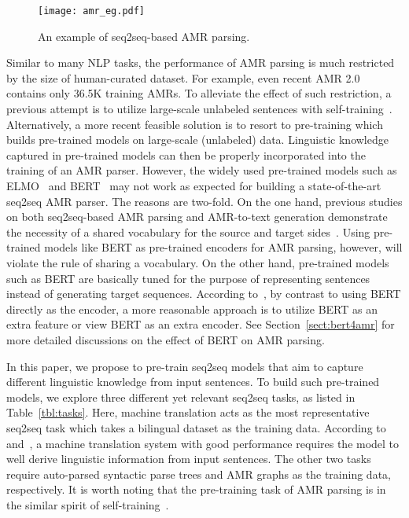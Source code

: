 \documentclass[11pt,a4paper]{article}
\newcommand{\ignore}[1]{}
\begin{document}
\begin{figure}[t]
\begin{center}
\texttt{[image: amr\_eg.pdf]}
\end{center}
\caption{An example of seq2seq-based AMR parsing.} \label{fig:amr_example}
\end{figure}

Similar to many NLP tasks, the performance of AMR parsing is much restricted by the size of human-curated dataset. For example, even recent AMR 2.0 contains only 36.5K training AMRs. To alleviate the effect of such restriction, a previous attempt is to utilize large-scale unlabeled sentences with self-training~\cite{konstas_etal_acl_2017}. Alternatively, a more recent feasible solution is to resort to pre-training which builds pre-trained models on large-scale (unlabeled) data. Linguistic knowledge captured in pre-trained models can then be properly incorporated into the training of an AMR parser. However, the widely used pre-trained models such as ELMO~\cite{peter_etal_naacl_2017} and BERT~\cite{devlin_etal_naacl_2019} may not work as expected for building a state-of-the-art seq2seq AMR parser. The reasons are two-fold. On the one hand, previous studies on both seq2seq-based AMR parsing and AMR-to-text generation demonstrate the necessity of a shared vocabulary for the source and target sides~\cite{ge_etal_ijcai_2019,zhu_etal_emnlp_2019}. Using pre-trained models like BERT as pre-trained encoders for AMR parsing, however, will violate the rule of sharing a vocabulary. On the other hand, pre-trained models such as BERT are basically tuned for the purpose of representing sentences instead of generating target sequences. According to~\citet{zhu_etal_iclr_2020}, by contrast to using BERT directly as the encoder, a more reasonable approach is to utilize BERT as an extra feature or view BERT as an extra encoder. See Section~\ref{sect:bert4amr} for more detailed discussions on the effect of BERT on AMR parsing. 

In this paper, we propose to pre-train seq2seq models that aim to capture different linguistic knowledge from input sentences\ignore{ and to properly generate output sequences}. To build such pre-trained models, we explore three different yet relevant seq2seq tasks, as listed in Table~\ref{tbl:tasks}. Here, machine translation acts as the most representative seq2seq task which takes a bilingual dataset as the training data. According to~\citet{shi_etal_emnlp_2016} and~\citet{li_etal_acl_2017}, a machine translation system with good performance requires the model to well derive linguistic information from input sentences. The other two tasks require auto-parsed syntactic parse trees and AMR graphs as the training data, respectively. It is worth noting that the pre-training task of AMR parsing is in the similar spirit of self-training~\cite{konstas_etal_acl_2017}.
\end{document}
